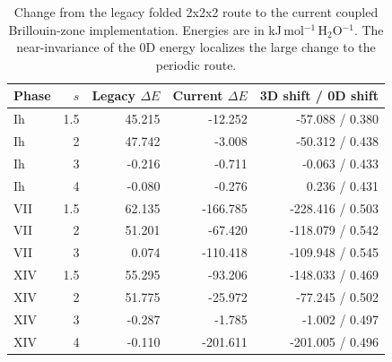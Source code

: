 \begin{table}
\caption{Change from the legacy folded 2x2x2 route to the current coupled Brillouin-zone implementation. Energies are in kJ\,mol$^{-1}$\,H$_2$O$^{-1}$. The near-invariance of the 0D energy localizes the large change to the periodic route.}
\begin{tabular}{lrrrr}
\hline\hline
Phase & $s$ & Legacy $\Delta E$ & Current $\Delta E$ & 3D shift / 0D shift \\
\hline
Ih & 1.5 & 45.215 & -12.252 & -57.088 / 0.380 \\
Ih & 2 & 47.742 & -3.008 & -50.312 / 0.438 \\
Ih & 3 & -0.216 & -0.711 & -0.063 / 0.433 \\
Ih & 4 & -0.080 & -0.276 & 0.236 / 0.431 \\
VII & 1.5 & 62.135 & -166.785 & -228.416 / 0.503 \\
VII & 2 & 51.201 & -67.420 & -118.079 / 0.542 \\
VII & 3 & 0.074 & -110.418 & -109.948 / 0.545 \\
XIV & 1.5 & 55.295 & -93.206 & -148.033 / 0.469 \\
XIV & 2 & 51.775 & -25.972 & -77.245 / 0.502 \\
XIV & 3 & -0.287 & -1.785 & -1.002 / 0.497 \\
XIV & 4 & -0.110 & -201.611 & -201.005 / 0.496 \\
\hline\hline
\end{tabular}
\end{table}
